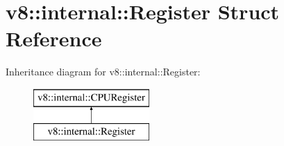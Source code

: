 \hypertarget{structv8_1_1internal_1_1_register}{}\section{v8\+:\+:internal\+:\+:Register Struct Reference}
\label{structv8_1_1internal_1_1_register}
Inheritance diagram for v8\+:\+:internal\+:\+:Register\+:\begin{figure}[H]
\begin{center}
\leavevmode
\includegraphics[height=2.000000cm]{structv8_1_1internal_1_1_register}
\end{center}
\end{figure}
